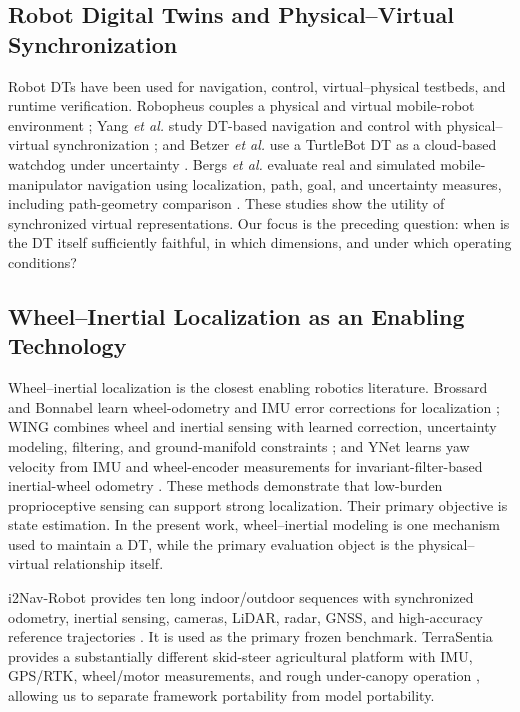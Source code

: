 \documentclass[journal]{IEEEtran}
\begin{document}
\subsection{Robot Digital Twins and Physical--Virtual Synchronization}
Robot DTs have been used for navigation, control, virtual--physical testbeds, and runtime verification. Robopheus couples a physical and virtual mobile-robot environment \cite{ding2021}; Yang \emph{et al.} study DT-based navigation and control with physical--virtual synchronization \cite{yang2025}; and Betzer \emph{et al.} use a TurtleBot DT as a cloud-based watchdog under uncertainty \cite{betzer2024}. Bergs \emph{et al.} evaluate real and simulated mobile-manipulator navigation using localization, path, goal, and uncertainty measures, including path-geometry comparison \cite{bergs2025}. These studies show the utility of synchronized virtual representations. Our focus is the preceding question: when is the DT itself sufficiently faithful, in which dimensions, and under which operating conditions?

\subsection{Wheel--Inertial Localization as an Enabling Technology}
Wheel--inertial localization is the closest enabling robotics literature. Brossard and Bonnabel learn wheel-odometry and IMU error corrections for localization \cite{brossard2019}; WING combines wheel and inertial sensing with learned correction, uncertainty modeling, filtering, and ground-manifold constraints \cite{jiang2025}; and YNet learns yaw velocity from IMU and wheel-encoder measurements for invariant-filter-based inertial-wheel odometry \cite{zhou2025ynet}. These methods demonstrate that low-burden proprioceptive sensing can support strong localization. Their primary objective is state estimation. In the present work, wheel--inertial modeling is one mechanism used to maintain a DT, while the primary evaluation object is the physical--virtual relationship itself.

i2Nav-Robot provides ten long indoor/outdoor sequences with synchronized odometry, inertial sensing, cameras, LiDAR, radar, GNSS, and high-accuracy reference trajectories \cite{tang2025}. It is used as the primary frozen benchmark. TerraSentia provides a substantially different skid-steer agricultural platform with IMU, GPS/RTK, wheel/motor measurements, and rough under-canopy operation \cite{cuaran2024}, allowing us to separate framework portability from model portability.
\end{document}

